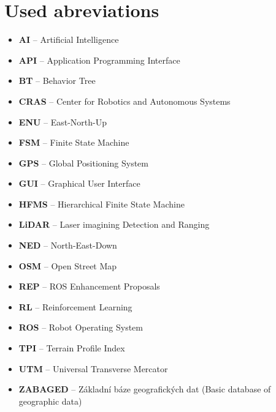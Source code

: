     \section*{Used abreviations}
        \begin{itemize}
            \item \textbf{AI} -- Artificial Intelligence
            \item \textbf{API} -- Application Programming Interface
            \item \textbf{BT} -- Behavior Tree
            \item \textbf{CRAS} -- Center for Robotics and Autonomous Systems
            \item \textbf{ENU} -- East-North-Up
            \item \textbf{FSM} -- Finite State Machine
            \item \textbf{GPS} -- Global Positioning System
            \item \textbf{GUI} -- Graphical User Interface
            \item \textbf{HFMS} -- Hierarchical Finite State Machine
            \item \textbf{LiDAR} -- Laser imagining Detection and Ranging
            \item \textbf{NED} -- North-East-Down
            \item \textbf{OSM} -- Open Street Map
            \item \textbf{REP} -- ROS Enhancement Proposals
            \item \textbf{RL} -- Reinforcement Learning
            \item \textbf{ROS} -- Robot Operating System
            \item \textbf{TPI} -- Terrain Profile Index
            \item \textbf{UTM} -- Universal Transverse Mercator
            \item \textbf{ZABAGED} -- Základní báze geografických dat (Basic database of geographic data)
        \end{itemize}
    